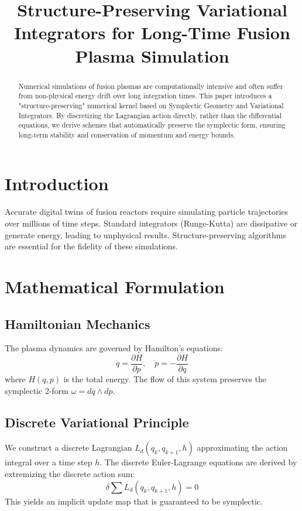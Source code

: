 \documentclass{article}
\title{Structure-Preserving Variational Integrators for Long-Time Fusion Plasma Simulation}
\author{}
\date{}
\begin{document}
\maketitle

\begin{abstract}
Numerical simulations of fusion plasmas are computationally intensive and often suffer from non-physical energy drift over long integration times. This paper introduces a "structure-preserving" numerical kernel based on Symplectic Geometry and Variational Integrators. By discretizing the Lagrangian action directly, rather than the differential equations, we derive schemes that automatically preserve the symplectic form, ensuring long-term stability and conservation of momentum and energy bounds.
\end{abstract}

\section{Introduction}
Accurate digital twins of fusion reactors require simulating particle trajectories over millions of time steps. Standard integrators (Runge-Kutta) are dissipative or generate energy, leading to unphysical results. Structure-preserving algorithms are essential for the fidelity of these simulations.

\section{Mathematical Formulation}

\subsection{Hamiltonian Mechanics}
The plasma dynamics are governed by Hamilton's equations:
\begin{equation}
 \dot{q} = \frac{\partial H}{\partial p}, \quad \dot{p} = -\frac{\partial H}{\partial q} 
\end{equation}
where $H(q, p)$ is the total energy. The flow of this system preserves the symplectic 2-form $\omega = dq \wedge dp$.

\subsection{Discrete Variational Principle}
We construct a discrete Lagrangian $L_d(q_k, q_{k+1}, h)$ approximating the action integral over a time step $h$. The discrete Euler-Lagrange equations are derived by extremizing the discrete action sum:
\begin{equation}
 \delta \sum L_d(q_k, q_{k+1}, h) = 0 
\end{equation}
This yields an implicit update map that is guaranteed to be symplectic.
\end{document}
